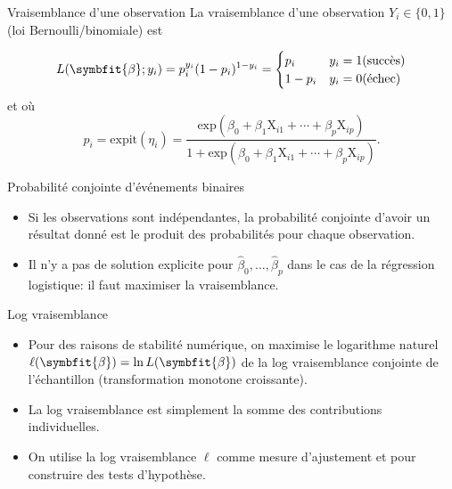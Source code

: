 \documentclass[
  ignorenonframetext,
]{beamer}
\providecommand{\tightlist}{%
  \setlength{\itemsep}{0pt}\setlength{\parskip}{0pt}}
\renewcommand{\boldsymbol}[1]{\symbfit{#1}}
\begin{document}
\begin{frame}{Vraisemblance d'une observation}
\protect{}\label{vraisemblance-dune-observation}
La vraisemblance d'une observation \(Y_i \in \{0,1\}\) (loi
Bernoulli/binomiale) est

\begin{align*}
L(\boldsymbol{\beta}; y_i) = p_i^{y_i}(1-p_i)^{1-y_i} = \begin{cases} 
p_i & y_i = 1 (\text{succès})\\
1-p_i & y_i = 0 (\text{échec}) 
\end{cases}
\end{align*} et où
\[p_i = \mathrm{expit}(\eta_i) = \frac{\mathrm{exp}(\beta_0 + \beta_1 \mathrm{X}_{i1} + \cdots + \beta_p\mathrm{X}_{ip})}{1+\mathrm{exp}(\beta_0 + \beta_1 \mathrm{X}_{i1} + \cdots + \beta_p\mathrm{X}_{ip})}.\]
\end{frame}

\begin{frame}{Probabilité conjointe d'événements binaires}
\protect{}\label{probabilituxe9-conjointe-duxe9vuxe9nements-binaires}
\begin{itemize}
\tightlist
\item
  Si les observations sont indépendantes, la probabilité conjointe
  d'avoir un résultat donné est le produit des probabilités pour chaque
  observation.
\item
  Il n'y a pas de solution explicite pour
  \(\widehat{\beta}_0, \ldots, \widehat{\beta}_p\) dans le cas de la
  régression logistique: il faut maximiser la vraisemblance.
\end{itemize}
\end{frame}

\begin{frame}{Log vraisemblance}
\protect{}\label{log-vraisemblance}
\begin{itemize}
\tightlist
\item
  Pour des raisons de stabilité numérique, on maximise le logarithme
  naturel \(\ell(\boldsymbol{\beta}) = \ln L(\boldsymbol{\beta})\) de la
  log vraisemblance conjointe de l'échantillon (transformation monotone
  croissante).
\item
  La log vraisemblance est simplement la somme des contributions
  individuelles.
\item
  On utilise la log vraisemblance \(\ell\) comme mesure d'ajustement et
  pour construire des tests d'hypothèse.
\end{itemize}
\end{frame}
\end{document}
